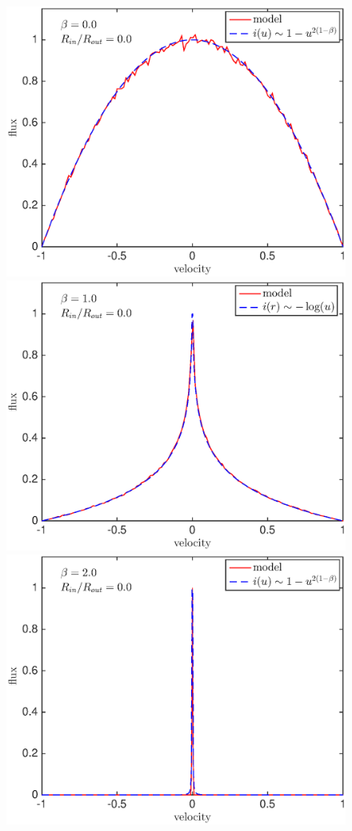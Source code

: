 \documentclass[useAMS,usenatbib,usegraphicx]{mnras}
\begin{document}
\begin{figure}
\\
\includegraphics[trim =25 5 45 15,clip=true,scale=0.34]{params/A/b0_r0}  
\includegraphics[trim =33 5 45 15,clip=true,scale=0.34]{params/A/b1_r0} 
\includegraphics[trim =33 5 45 15,clip=true,scale=0.34]{params/A/b2_r0}


\end{figure}
\end{document}

